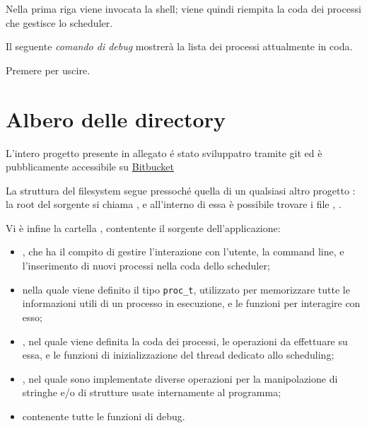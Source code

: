 \documentclass[11pt]{article}
\begin{document}
\noindent Nella prima riga viene invocata la shell; viene quindi riempita la
coda dei processi che gestisce lo scheduler.
\\ 

\noindent Il seguente \emph{comando di debug} mostrer\`a la lista dei processi
attualmente in coda.
\\ 

\noindent Premere  per uscire.

\section{Albero delle directory}

L'intero progetto presente in allegato \'e stato sviluppatro tramite git ed
\`e pubblicamente accessibile su
\href{https://bitbucket.org/maker/shellder/}{Bitbucket}

La struttura del filesystem segue pressoch\'e quella di un qualsiasi altro progetto :
la root del sorgente si chiama , e all'interno di essa \`e possibile trovare i
file , .

Vi \`e infine la cartella , contentente il sorgente dell'applicazione:
\begin{itemize}
\item {}, che ha il compito di gestire l'interazione con l'utente, la command line,
       e l'inserimento di nuovi processi nella coda dello scheduler;

\item {} nella quale viene definito il tipo \texttt{proc\_t}, utilizzato per memorizzare
	   tutte le informazioni utili di un processo in esecuzione, e le funzioni per interagire con esso;

\item {}, nel quale viene definita la coda dei processi, le operazioni da
       effettuare su essa, e le funzioni di inizializzazione del thread dedicato allo scheduling;

\item {}, nel quale sono implementate diverse operazioni per la manipolazione di
       stringhe e/o di strutture usate internamente al programma;

\item {} contenente tutte le funzioni di debug.
\end{itemize}
\end{document}
